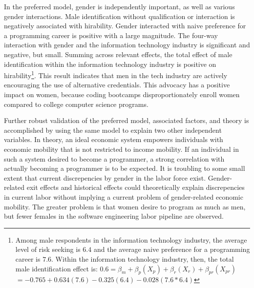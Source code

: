 \documentclass[review]{elsarticle}
\begin{document}
In the preferred model, gender is independently important, as well as various gender interactions.
Male identification without qualification or interaction is negatively associated with hirability.
Gender interacted with naive preference for a programming career is positive with a large magnitude.
The four-way interaction with gender and the information technology industry is significant and negative, but small.
Summing across relevant effects,
the total effect of male identification within the information technology industry
is positive on hirability\footnote{
    Among male respondents in the information technology industry, the average level of risk seeking is $6.4$
    and the average naive preference for a programming career is $7.6$.
    Within the information technology industry, then, the total male identification effect is:
    $ 0.6 = \beta_{m} + \beta_{p}(X_{p}) + \beta_{r}(X_{r}) + \beta_{pr}(X_{pr})$
    $ = -0.765 + 0.634(7.6) - 0.325(6.4) - 0.028(7.6*6.4)$
}.
This result indicates that men in the tech industry are actively encouraging the use of alternative credentials.
This advocacy has a positive impact on women, because coding bootcamps disproportionately enroll women compared to college computer science programs.


Further robust validation of the preferred model, associated factors, and theory
is accomplished by using the same model to explain two other independent variables.
In theory, an ideal economic system empowers individuals with economic mobility that is not restricted to income mobility.
If an individual in such a system desired to become a programmer,
a strong correlation with actually becoming a programmer is to be expected.
It is troubling to some small extent that current discrepencies by gender in the labor force exist.
Gender-related exit effects and historical effects could theoretically explain discrepencies in current labor without implying
a current problem of gender-related economic mobility.
The greater problem is that women desire to program as much as men, but fewer females in the software engineering labor pipeline are observed.
\end{document}
